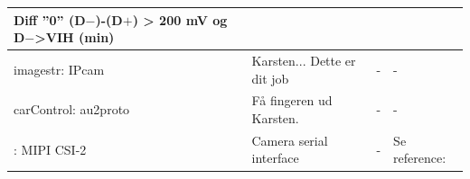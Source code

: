 \begin{table}[h]
\begin{tabularx}{\textwidth}{|l|X|X|X|}
		Diff ''0''						\newline
		(D$-$)-(D$+$) > 200 mV				\newline
		og D$-$>VIH (min)					\newline
	\\ \hline	
	
imagestr: IPcam
	& Karsten... Dette er dit job %
	& - 
	& -	
	\\ \hline

carControl: au2proto
	& Få fingeren ud Karsten. %
	& -
	& -
	\\ \hline
	
: MIPI CSI-2
	& Camera serial interface
	& -
	& Se reference: \cite{lib:MIPICSI-2}
	\end{tabularx}
\end{table}
